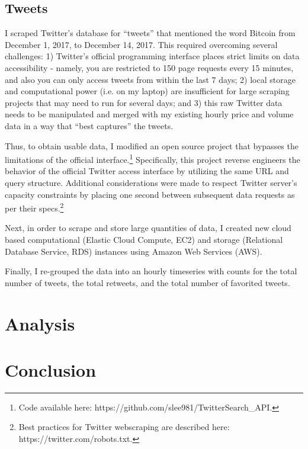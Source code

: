 \documentclass{article}
\begin{document}
	
	\subsection{Tweets}
	I scraped Twitter's database for ``tweets'' that mentioned the word Bitcoin from December 1, 2017, to December 14, 2017. This required overcoming several challenges: 1) Twitter's official programming interface places strict limits on data accessibility - namely, you are restricted to 150 page requests every 15 minutes, and also you can only access tweets from within the last 7 days; 2) local storage and computational power (i.e. on my laptop) are insufficient for large scraping projects that may need to run for several days; and 3) this raw Twitter data needs to be manipulated and merged with my existing hourly price and volume data in a way that ``best captures'' the tweets. 
	
	Thus, to obtain usable data, I modified an open source project that bypasses the limitations of the official interface.\footnote{Code available here: https://github.com/slee981/TwitterSearch\_API.} Specifically, this project reverse engineers the behavior of the official Twitter access interface by utilizing the same URL and query structure. Additional considerations were made to respect Twitter server's capacity constraints by placing one second between subsequent data requests as per their specs.\footnote{Best practices for Twitter webscraping are described here: https://twitter.com/robots.txt.} 
	
	Next, in order to scrape and store large quantities of data, I created new cloud based computational (Elastic Cloud Compute, EC2) and storage (Relational Database Service, RDS) instances using Amazon Web Services (AWS).
	
	Finally, I re-grouped the data into an hourly timeseries with counts for the total number of tweets, the total retweets, and the total number of favorited tweets. 
	
	\section{Analysis}
	
	\section{Conclusion}
	
\end{document}
